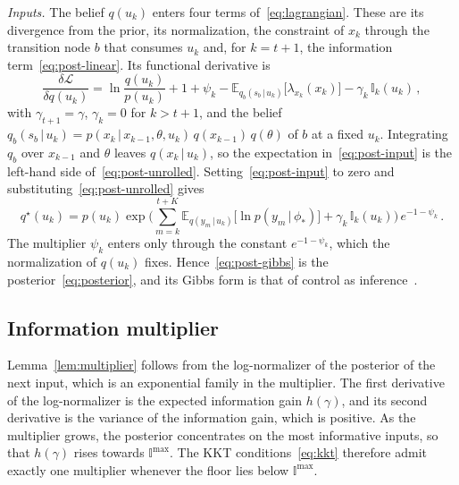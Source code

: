 \documentclass{l4dc2027}
\newcommand\given[1][]{\,#1\vert\,}
\newcommand{\E}{\mathbb{E}}
\newenvironment{proofof}[1]{\par\noindent{\bfseries\upshape Proof of #1\ }}{\jmlrQED}
\begin{document}
\begin{proofof}{Theorem~\ref{thm:posterior}}
\emph{Inputs.} The belief $q(u_k)$ enters four terms of~\eqref{eq:lagrangian}. These are its divergence from the prior, its normalization, the constraint of $x_k$ through the transition node $b$ that consumes $u_k$ and, for $k = t+1$, the information term~\eqref{eq:post-linear}. Its functional derivative is
\begin{equation}\label{eq:post-input}
	\frac{\delta \mathcal{L}}{\delta q(u_k)} = \ln \frac{q(u_k)}{p(u_k)} + 1 + \psi_k - \E_{q_b(s_b \given u_k)}\big[\lambda_{x_k}(x_k)\big] - \gamma_k\, \mathbb{I}_k(u_k) \, ,
\end{equation}
with $\gamma_{t+1} = \gamma$, $\gamma_k = 0$ for $k > t+1$, and the belief $q_b(s_b \given u_k) = p(x_k \given x_{k-1}, \theta, u_k)\, q(x_{k-1})\, q(\theta)$ of $b$ at a fixed $u_k$. Integrating $q_b$ over $x_{k-1}$ and $\theta$ leaves $q(x_k \given u_k)$, so the expectation in~\eqref{eq:post-input} is the left-hand side of~\eqref{eq:post-unrolled}. Setting~\eqref{eq:post-input} to zero and substituting~\eqref{eq:post-unrolled} gives
\begin{equation}\label{eq:post-gibbs}
	q^\star(u_k) = p(u_k) \exp\Big( \sum_{m=k}^{t+K} \E_{q(y_m \given u_k)}\big[\ln p(y_m \given \phi_*)\big] + \gamma_k\, \mathbb{I}_k(u_k) \Big)\, e^{-1-\psi_k} \, .
\end{equation}
The multiplier $\psi_k$ enters only through the constant $e^{-1-\psi_k}$, which the normalization of $q(u_k)$ fixes. Hence~\eqref{eq:post-gibbs} is the posterior~\eqref{eq:posterior}, and its Gibbs form is that of control as inference~\citep{levine2018reinforcement}.
\end{proofof}

\subsection{Information multiplier}\label{supp:multiplier}

Lemma~\ref{lem:multiplier} follows from the log-normalizer of the posterior of the next input, which is an exponential family in the multiplier. The first derivative of the log-normalizer is the expected information gain $h(\gamma)$, and its second derivative is the variance of the information gain, which is positive. As the multiplier grows, the posterior concentrates on the most informative inputs, so that $h(\gamma)$ rises towards $\mathbb{I}^{\max}$. The KKT conditions~\eqref{eq:kkt} therefore admit exactly one multiplier whenever the floor lies below $\mathbb{I}^{\max}$.
\end{document}
